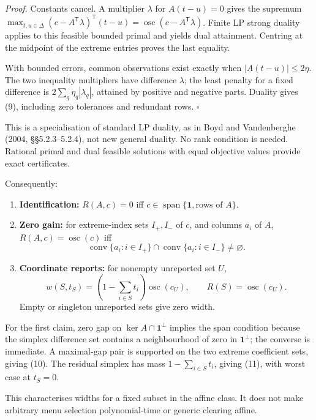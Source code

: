 \documentclass[
  british,
  11pt,
  a4paper,
]{article}
\newcounter{none} %
\providecommand{\tightlist}{%
  \setlength{\itemsep}{0pt}\setlength{\parskip}{0pt}}
\begin{document}
\emph{Proof.} Constants cancel. A multiplier \(\lambda\) for
\(A(t-u)=0\) gives the supremum
\(\max_{t,u\in\Delta}(c-A^\mathsf T\lambda)^\mathsf T(t-u)=\operatorname{osc}(c-A^\mathsf T\lambda)\).
Finite LP strong duality applies to this feasible bounded primal and
yields dual attainment. Centring at the midpoint of the extreme entries
proves the last equality.

With bounded errors, common observations exist exactly when
\(|A(t-u)|\le2\eta\). The two inequality multipliers have difference
\(\lambda\); the least penalty for a fixed difference is
\(2\sum_q\eta_q|\lambda_q|\), attained by positive and negative parts.
Duality gives (9), including zero tolerances and redundant rows.
\(\square\)

This is a specialisation of standard LP duality, as in Boyd and
Vandenberghe (2004, §§5.2.3--5.2.4), not new general duality. No rank
condition is needed. Rational primal and dual feasible solutions with
equal objective values provide exact certificates.

Consequently:

\begin{enumerate}
\def\labelenumi{\arabic{enumi}.}
\tightlist
\item
  \textbf{Identification:} \(R(A,c)=0\) iff
  \(c\in\operatorname{span}\{\mathbf1,\text{rows of }A\}\).
\item
  \textbf{Zero gain:} for extreme-index sets \(I_+,I_-\) of \(c\), and
  columns \(a_i\) of \(A\), \(R(A,c)=\operatorname{osc}(c)\) iff \[
  \operatorname{conv}\{a_i:i\in I_+\}\cap\operatorname{conv}\{a_i:i\in I_-\}\ne\varnothing.
  \tag{10}
  \]
\item
  \textbf{Coordinate reports:} for nonempty unreported set \(U\), \[
  w(S,t_S)=\left(1-\sum_{i\in S}t_i\right)\operatorname{osc}(c_U),\qquad
  R(S)=\operatorname{osc}(c_U).
  \tag{11}
  \] Empty or singleton unreported sets give zero width.
\end{enumerate}

For the first claim, zero gap on \(\ker A\cap\mathbf1^\perp\) implies
the span condition because the simplex difference set contains a
neighbourhood of zero in \(\mathbf1^\perp\); the converse is immediate.
A maximal-gap pair is supported on the two extreme coefficient sets,
giving (10). The residual simplex has mass \(1-\sum_{i\in S}t_i\),
giving (11), with worst case at \(t_S=0\).

This characterises widths for a fixed subset in the affine class. It
does not make arbitrary menu selection polynomial-time or generic
clearing affine.
\end{document}
